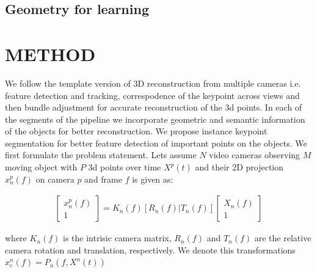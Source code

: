 \documentclass[10pt,twocolumn,letterpaper]{article}
\begin{document}
\subsection{Geometry for learning}
\section{METHOD}
We follow the template version of 3D reconstruction from multiple cameras i.e. feature detection and tracking, correspodence of the keypoint across views and then bundle adjustment for accurate reconstruction of the 3d points. In each of the segments of the pipeline we incorporate geometric and semantic information of the objects for better reconstruction. We propose instance keypoint segmentation for better feature detection of important points on the objects. 
We first formulate the problem statement. Lets assume $N$ video cameras observing $M$ moving object with $P$ 3d points over time $X^p(t)$ and their 2D projection $x^p_n(f)$ on camera $p$ and frame $f$ is given as:

\begin{align*}
 \begin{bmatrix} x_n^p(f) \\ 1  \end{bmatrix} = K_n(f)[R_n(f) | T_n(f)] \begin{bmatrix} X_n(f) \\ 1  \end{bmatrix}
\end{align*} 

where $K_n(f)$ is the intrisic camera matrix, $R_n(f)$ and $T_n(f)$ are the relative camera rotation and translation, respectively. We denote this transformations $x_c^n(f) = P_n(f,X^n(t))$
\end{document}
